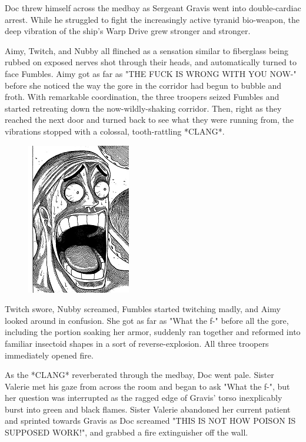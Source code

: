 Doc threw himself across the medbay as Sergeant Gravis went into double-cardiac arrest. 
While he struggled to fight the increasingly active tyranid bio-weapon, the deep vibration of the ship's Warp Drive grew stronger and stronger.

Aimy, Twitch, and Nubby all flinched as a sensation similar to fiberglass being rubbed on exposed nerves shot through their heads, and automatically turned to face Fumbles. 
Aimy got as far as "THE FUCK IS WRONG WITH YOU NOW-" before she noticed the way the gore in the corridor had begun to bubble and froth. 
With remarkable coordination, the three troopers seized Fumbles and started retreating down the now-wildly-shaking corridor. 
Then, right as they reached the next door and turned back to see what they were running from, the vibrations stopped with a colossal, tooth-rattling *CLANG*.

\begin{figure}
	\begin{center}
		\includegraphics[width=\figwidth]{pics/13/14.png}
	\end{center}
\end{figure}
Twitch swore, Nubby screamed, Fumbles started twitching madly, and Aimy looked around in confusion. 
She got as far as "What the f-" before all the gore, including the portion soaking her armor, suddenly ran together and reformed into familiar insectoid shapes in a sort of reverse-explosion. 
All three troopers immediately opened fire.

As the *CLANG* reverberated through the medbay, Doc went pale. 
Sister Valerie met his gaze from across the room and began to ask "What the f-", but her question was interrupted as the ragged edge of Gravis' torso inexplicably burst into green and black flames. 
Sister Valerie abandoned her current patient and sprinted towards Gravis as Doc screamed "THIS IS NOT HOW POISON IS SUPPOSED WORK!", and grabbed a fire extinguisher off the wall.


